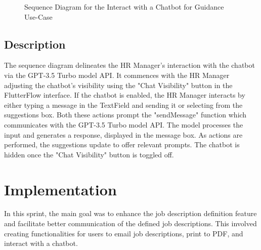 \begin{figure}[H]
    \centering
    \caption{ Sequence Diagram for the Interact with a Chatbot for Guidance Use-Case }
    \label{fig:UseCase3Sprint3_Sequence_Diagram}
\end{figure}

\subsection*{Description}
The sequence diagram delineates the HR Manager's interaction with the chatbot via the GPT-3.5 Turbo model API. It commences with the HR Manager adjusting the chatbot's visibility using the "Chat Visibility" button in the FlutterFlow interface. If the chatbot is enabled, the HR Manager interacts by either typing a message in the TextField and sending it or selecting from the suggestions box. Both these actions prompt the "sendMessage" function which communicates with the GPT-3.5 Turbo model API. The model processes the input and generates a response, displayed in the message box. As actions are performed, the suggestions update to offer relevant prompts. The chatbot is hidden once the "Chat Visibility" button is toggled off.

\section{Implementation}
In this sprint, the main goal was to enhance the job description definition feature and facilitate better communication of the defined job descriptions. This involved creating functionalities for users to email job descriptions, print to PDF, and interact with a chatbot.

